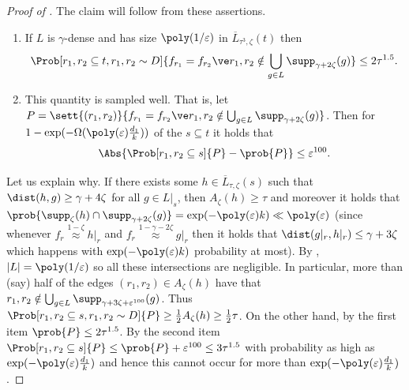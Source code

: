\begin{proof}[Proof of ]
    The claim will follow from these assertions.
    \begin{enumerate}
        \item If \(L\) is \(\gamma\)-dense and has size \(\poly(1/\varepsilon)\) in \(\overline{L}_{\tau^3,\zeta}(t)\) then 
        \[\Prob[r_1,r_2 \subseteq t, r_1,r_2 \sim D]{f_{r_1}=f_{r_2} \ve r_1,r_2 \notin \bigcup_{g \in L}\supp_{\gamma+2\zeta}(g)} \leq 2\tau^{1.5}.\]
        \item This quantity is sampled well. That is, let \(P = \sett{(r_1,r_2)}{f_{r_1}=f_{r_2} \ve r_1,r_2 \notin \bigcup_{g \in L}\supp_{\gamma+2\zeta}(g)}\). Then for \(1-\exp(-\Omega(\poly(\varepsilon)\frac{d_1}{k}))\) of the \(s \subseteq t\) it holds that
        \[\Abs{\Prob[r_1,r_2 \subseteq s]{P} - \prob{P}} \leq \varepsilon^{100}.\]
    \end{enumerate}
    Let us explain why. If there exists some \(h \in \overline{L}_{\tau,\zeta}(s)\) such that \(\dist(h,g) \geq \gamma+4\zeta\) for all \(g \in L|_s\), then \(A_{\zeta}(h) \geq \tau\) and moreover it holds that \(\prob{\supp_\zeta(h) \cap \supp_{\gamma+2\zeta}(g)} = \exp(-\poly(\varepsilon)k) \ll \poly(\varepsilon)\) (since whenever \(f_r\overset{1-\zeta}{\approx}h|_r\) and \(f_r\overset{1-\gamma-2\zeta}{\approx}g|_r\) then it holds that \(\dist(g|_r,h|_r)\leq \gamma+3\zeta\) which happens with \(\exp(-\poly(\varepsilon)k)\) probability at most). By , \(|L|=\poly(1/\varepsilon)\) so all these intersections are negligible. In particular, more than (say) half of the edges \((r_1,r_2) \in A_{\zeta}(h)\) have that \(r_1,r_2 \notin \bigcup_{g \in L}\supp_{\gamma+3\zeta+\varepsilon^{100}}(g)\). Thus \(\Prob[r_1,r_2 \subseteq s, r_1,r_2 \sim D]{P} \geq \frac{1}{2} A_\zeta(h) \geq \frac{1}{2}\tau\). On the other hand, by the first item \(\prob{P} \leq 2\tau^{1.5}\). By the second item \(\Prob[r_1,r_2 \subseteq s]{P} \leq \prob{P} + \varepsilon^{100}\leq 3\tau^{1.5}\) with probability as high as \(\exp(-\poly(\varepsilon)\frac{d_1}{k})\) and hence this cannot occur for more than \(\exp(-\poly(\varepsilon)\frac{d_1}{k})\).

\medskip


\end{proof}
